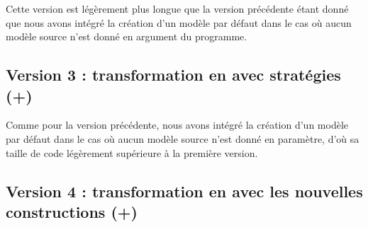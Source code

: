 Cette version est légèrement plus longue que la version précédente étant donné
que nous avons intégré la création d'un modèle par défaut dans le cas où aucun
modèle source n'est donné en argument du programme.



\subsection{Version 3 : transformation en {\tomjava} avec stratégies (+{\emf})}
\label{annexe:flattening:v3}

Comme pour la version précédente, nous avons intégré la création d'un modèle
par défaut dans le cas où aucun modèle source n'est donné en paramètre, d'où sa
taille de code légèrement supérieure à la première version.
%


\subsection{Version 4 : transformation en {\tomjava} avec les nouvelles constructions (+{\emf})}
\label{annexe:flattening:v4}
%



\label{annexe:atlpdl2pn}


